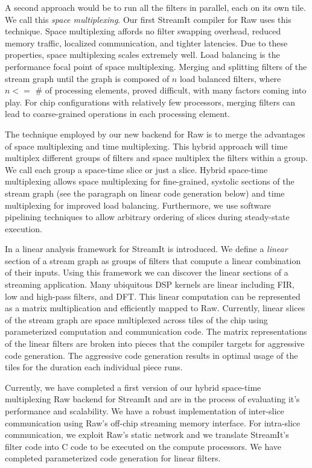 \documentclass{csailabstractbook}
\begin{document}
A second approach would be to run all the filters in parallel, each on
its own tile.  We call this {\it space multiplexing}.  Our first 
StreamIt compiler for Raw uses this technique.  Space multiplexing
affords no filter swapping overhead, reduced memory traffic,
localized communication, and tighter latencies.  Due to these
properties, space multiplexing scales extremely well.  
Load balancing is the performance focal point of space multiplexing.  Merging
and splitting filters of the stream graph until the graph is composed
of $n$ load balanced filters, where $n <=$ \# of processing
elements, proved difficult, with many factors coming into play.  
For chip configurations with relatively few processors, merging filters
can lead to coarse-grained operations in each processing element. 

The technique employed by our new backend for Raw is to merge the
advantages of space multiplexing and time multiplexing.  This hybrid
approach will time multiplex different groups of filters and space
multiplex the filters within a group. We call each group a space-time
slice or just a slice.  Hybrid space-time multiplexing allows space
multiplexing for fine-grained, systolic sections of the stream graph
(see the paragraph on linear code generation below) and time
multiplexing for improved load balancing.  Furthermore, we use
software pipelining techniques to allow arbitrary ordering of slices
during steady-state execution.

In \cite{lamb03} a linear analysis framework for StreamIt is
introduced.  We define a {\it linear} section of a stream graph as
groups of filters that compute a linear combination of their inputs.
Using this framework we can discover the linear sections of a
streaming application.  Many ubiquitous DSP kernels are linear
including FIR, low and high-pass filters, and DFT.  This linear
computation can be represented as a matrix multiplication and
efficiently mapped to Raw.  Currently, linear slices of the stream
graph are space multiplexed across tiles of the chip using
parameterized computation and communication code.  The matrix
representations of the linear filters are broken into pieces
that the compiler targets for aggressive code generation.  The
aggressive code generation results in optimal usage of the tiles
for the duration each individual piece runs.
 
Currently, we have completed a first version of our hybrid space-time
multiplexing Raw backend for StreamIt and are in the process of
evaluating it's performance and scalability.  We have a robust
implementation of inter-slice communication using Raw's off-chip
streaming memory interface.  For intra-slice communication, we exploit
Raw's static network and we translate StreamIt's filter code into C
code to be executed on the compute processors.  We have completed
parameterized code generation for linear filters.   
\end{document}
